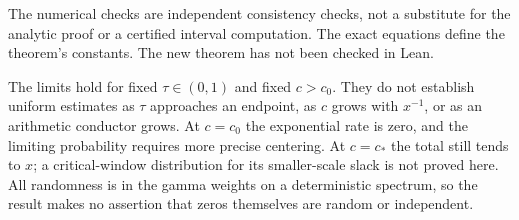 \documentclass[11pt,letterpaper]{article}
\numberwithin{equation}{section}
\theoremstyle{definition}
\theoremstyle{remark}
\begin{document}
The numerical checks are independent consistency checks, not a substitute for the analytic proof or a certified interval computation. The exact equations define the theorem's constants. The new theorem has not been checked in Lean.

The limits hold for fixed $\tau\in(0,1)$ and fixed $c>c_0$. They do not establish uniform estimates as $\tau$ approaches an endpoint, as $c$ grows with $x^{-1}$, or as an arithmetic conductor grows. At $c=c_0$ the exponential rate is zero, and the limiting probability requires more precise centering. At $c=c_*$ the total still tends to $x$; a critical-window distribution for its smaller-scale slack is not proved here. All randomness is in the gamma weights on a deterministic spectrum, so the result makes no assertion that zeros themselves are random or independent.
\end{document}
